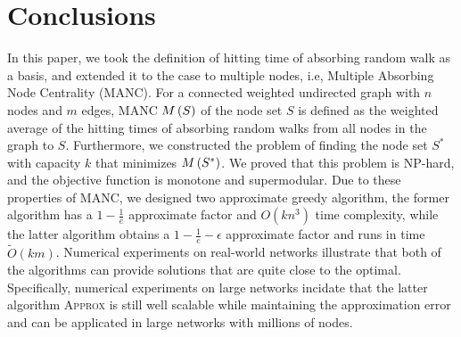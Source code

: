 \documentclass[sigconf]{acmart}
\begin{document}
\section{Conclusions}\label{sec:conc}

In this paper, we took the definition of hitting time of absorbing random walk as a basis, and extended it to the case to multiple nodes, i.e, Multiple Absorbing Node Centrality (MANC).
For a connected weighted undirected graph with \(n\) nodes and \(m\) edges, MANC \(M\left(S\right)\) of the node set \(S\) is defined as the weighted average of the hitting times of absorbing random walks from all nodes in the graph to \(S\).
Furthermore, we constructed the problem of finding the node set \(S^*\) with capacity \(k\) that minimizes \(M\left(S^*\right)\).
We proved that this problem is NP-hard, and the objective function is monotone and supermodular.
Due to these properties of MANC, we designed two approximate greedy algorithm, the former algorithm has a \(1-\frac1e\) approximate factor and \(O(kn^3)\) time complexity, while the latter algorithm obtains a \(1-\frac1e-\epsilon\) approximate factor and runs in time \(\tilde{O}(km)\).
Numerical experiments on real-world networks illustrate that both of the algorithms can provide solutions that are quite close to the optimal.
Specifically, numerical experiments on large networks incidate that the latter algorithm \textsc{Approx} is still well scalable while maintaining the approximation error and can be applicated in large networks with millions of nodes.


\balance

\end{document}
